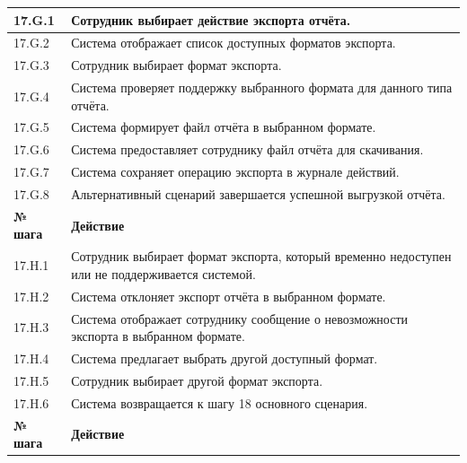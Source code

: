 \documentclass[12pt,a4paper]{article}
\begin{document}
\begin{xltabular}{\textwidth}{
				|>{\raggedright\arraybackslash}p{2.7cm}
				|>{\raggedright\arraybackslash}X|
			}
			17.G.1 & Сотрудник выбирает действие экспорта отчёта. \\
			\hline
			17.G.2 & Система отображает список доступных форматов экспорта. \\
			\hline
			17.G.3 & Сотрудник выбирает формат экспорта. \\
			\hline
			17.G.4 & Система проверяет поддержку выбранного формата для данного типа
			отчёта. \\
			\hline
			17.G.5 & Система формирует файл отчёта в выбранном формате. \\
			\hline
			17.G.6 & Система предоставляет сотруднику файл отчёта для скачивания. \\
			\hline
			17.G.7 & Система сохраняет операцию экспорта в журнале действий. \\
			\hline
			17.G.8 & Альтернативный сценарий завершается успешной выгрузкой отчёта. \\
			\hline
			
			
			\textbf{№ шага} & \textbf{Действие} \\
			\hline
			
			17.H.1 & Сотрудник выбирает формат экспорта, который временно недоступен
			или не поддерживается системой. \\
			\hline
			17.H.2 & Система отклоняет экспорт отчёта в выбранном формате. \\
			\hline
			17.H.3 & Система отображает сотруднику сообщение о невозможности экспорта
			в выбранном формате. \\
			\hline
			17.H.4 & Система предлагает выбрать другой доступный формат. \\
			\hline
			17.H.5 & Сотрудник выбирает другой формат экспорта. \\
			\hline
			17.H.6 & Система возвращается к шагу 18 основного сценария. \\
			\hline
			
			
			\textbf{№ шага} & \textbf{Действие} \\
			\hline
			

\end{xltabular}
\end{document}
